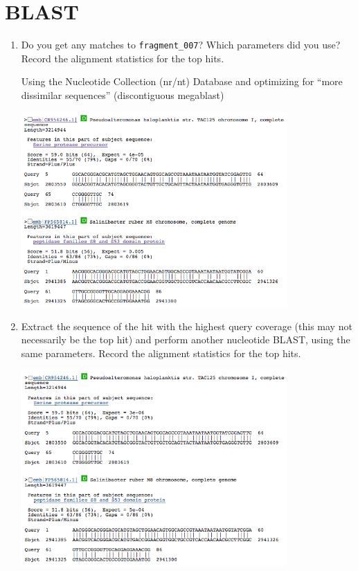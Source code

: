 \documentclass[a4paper,11pt]{article}
\begin{document}
\section{BLAST}

\begin{enumerate}
\item Do you get any matches to \texttt{fragment\_007}? Which parameters did you use? Record the alignment statistics for the top hits.

Using the Nucleotide Collection (nr/nt) Database and optimizing for ``more dissimilar sequences''
(discontiguous megablast)

\vspace{0.5cm}
\begin{center}
\includegraphics[width=0.8\textwidth]{blastn1.png}
\end{center}
\vspace{0.5cm}

\item Extract the sequence of the hit with the highest query coverage (this may not necessarily be the top hit) and perform another nucleotide BLAST, using the same parameters. Record the alignment statistics for the top hits.

\vspace{0.5cm}
\begin{center}
\includegraphics[width=0.8\textwidth]{blastn2.png}
\end{center}
\vspace{0.5cm}


\end{enumerate}
\end{document}
